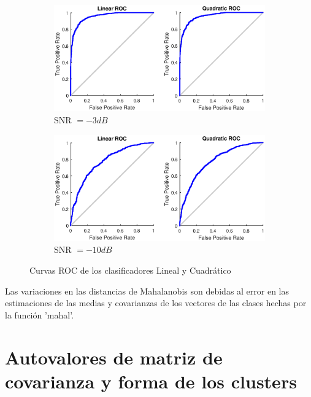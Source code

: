 \documentclass[11pt]{article} %
\begin{document}
\begin{figure}[h]
	\centering
	\begin{subfigure}[b]{\textwidth}
		\centering
		\includegraphics[width=\textwidth]{../Part_1/ROC_-3.eps}
		\caption[]{\small SNR $ = -3 dB$}
		\label{fig:p1:roc:-3}
	\end{subfigure}
	
	\begin{subfigure}[b]{\textwidth}
		\centering
		\includegraphics[width=\textwidth]{../Part_1/ROC_-10.eps}
		\caption[]{\small SNR $ = -10 dB$} 
		\label{fig:p1:roc:-10}
	\end{subfigure}
	\label{fig:p1}
	\caption{Curvas ROC de los clasificadores Lineal y Cuadrático}
\end{figure}

Las variaciones en las distancias de Mahalanobis son debidas al error en las estimaciones de las medias y covarianzas de los vectores de las clases hechas por la función 'mahal'.

\clearpage

\section[Parte 2 - Autovalores]{Autovalores de matriz de covarianza y
	forma de los clusters}
\end{document}
